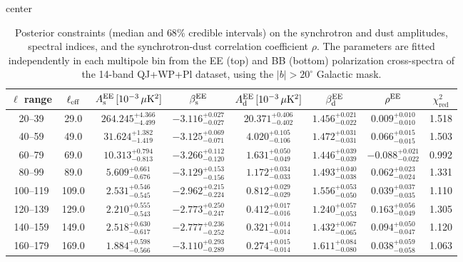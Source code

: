 \begin{table}[h]
\centering
\setlength{\tabcolsep}{4pt}
\caption{Posterior constraints (median and $68\%$ credible intervals) on the synchrotron and dust amplitudes, spectral indices, and the synchrotron-dust correlation coefficient $\rho$. The parameters are fitted independently in each multipole bin from the EE (top) and BB (bottom) polarization cross-spectra of the 14-band QJ+WP+Pl dataset, using the $|b|>20^\circ$ Galactic mask.}
\label{tab:bin_to_bin_galcut20_cross_only}
\begin{adjustbox}{center}
\begin{tabular}{cccccccc}
\toprule
$\ell$ range & $\ell_{\rm eff}$ & $A^{\rm EE}_{\rm s}\,[10^{-3}\,\mu\mathrm{K}^2]$ & $\beta^{\rm EE}_{\rm s}$ & $A^{\rm EE}_{\rm d}\,[10^{-3}\,\mu\mathrm{K}^2]$ & $\beta^{\rm EE}_{\rm d}$ & $\rho^{\rm EE}$ & $\chi^2_\mathrm{red}$ \\
\midrule
20--39 & 29.0 & $264.245^{+4.366}_{-4.499}$ & $-3.116^{+0.027}_{-0.027}$ & $20.371^{+0.406}_{-0.402}$ & $1.456^{+0.021}_{-0.022}$ & $0.009^{+0.010}_{-0.010}$ & 1.518 \\
40--59 & 49.0 & $31.624^{+1.382}_{-1.419}$ & $-3.125^{+0.069}_{-0.071}$ & $4.020^{+0.105}_{-0.106}$ & $1.472^{+0.031}_{-0.031}$ & $0.066^{+0.015}_{-0.015}$ & 1.503 \\
60--79 & 69.0 & $10.313^{+0.794}_{-0.813}$ & $-3.266^{+0.112}_{-0.120}$ & $1.631^{+0.050}_{-0.049}$ & $1.446^{+0.039}_{-0.039}$ & $-0.088^{+0.021}_{-0.022}$ & 0.992 \\
80--99 & 89.0 & $5.609^{+0.661}_{-0.676}$ & $-3.129^{+0.153}_{-0.156}$ & $1.172^{+0.034}_{-0.033}$ & $1.493^{+0.040}_{-0.038}$ & $0.062^{+0.023}_{-0.024}$ & 1.331 \\
100--119 & 109.0 & $2.531^{+0.546}_{-0.545}$ & $-2.962^{+0.215}_{-0.224}$ & $0.812^{+0.029}_{-0.029}$ & $1.556^{+0.053}_{-0.050}$ & $0.039^{+0.037}_{-0.035}$ & 1.110 \\
120--139 & 129.0 & $2.210^{+0.555}_{-0.543}$ & $-2.773^{+0.250}_{-0.247}$ & $0.412^{+0.017}_{-0.016}$ & $1.240^{+0.057}_{-0.053}$ & $0.163^{+0.056}_{-0.049}$ & 1.305 \\
140--159 & 149.0 & $2.518^{+0.630}_{-0.617}$ & $-2.777^{+0.236}_{-0.252}$ & $0.321^{+0.014}_{-0.014}$ & $1.432^{+0.067}_{-0.065}$ & $0.094^{+0.050}_{-0.047}$ & 1.120 \\
160--179 & 169.0 & $1.884^{+0.598}_{-0.566}$ & $-3.110^{+0.293}_{-0.289}$ & $0.274^{+0.015}_{-0.014}$ & $1.611^{+0.084}_{-0.080}$ & $0.038^{+0.059}_{-0.058}$ & 1.063 \\

\end{tabular}
\end{adjustbox}
\end{table}
